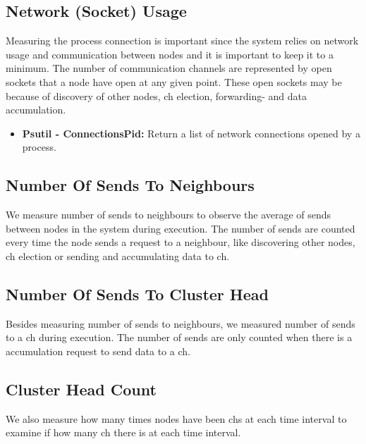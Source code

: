\documentclass[USenglish]{uit-thesis}
\begin{document}
\subsection{Network (Socket) Usage} \label{eva:net_measure}

Measuring the process connection is important since the system relies on network usage and communication between nodes and it is important to keep it to a minimum. The number of communication channels are represented by open sockets that a node have open at any given point. These open sockets may be because of discovery of other nodes, \gls{ch} election, forwarding- and data accumulation.

\begin{itemize}
\item \textbf{Psutil - ConnectionsPid:} Return a list of network connections opened by a process.
\end{itemize}



\subsection{Number Of Sends To Neighbours}
We measure number of sends to neighbours to observe the average of sends between nodes in the system during execution. The number of sends are counted every time the node sends a request to a neighbour, like discovering other nodes, \gls{ch} election or sending and accumulating data to \gls{ch}.


\subsection{Number Of Sends To Cluster Head}
Besides measuring number of sends to neighbours, we measured number of sends to a \gls{ch} during execution. The number of sends are only counted when there is a accumulation request to send data to a \gls{ch}.


\subsection{Cluster Head Count}
We also measure how many times nodes have been \gls{ch}s at each time interval to examine if how many \gls{ch} there is at each time interval.
\end{document}
